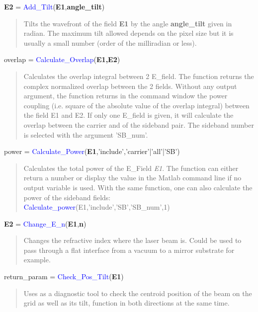 \noindent \textbf{E2} = \textcolor{blue}{ Add\_Tilt}(\textbf{E1},\textbf{angle\_tilt})
\vspace*{-0.2cm}
\begin{quote}
Tilts the wavefront of the field \textbf{E1} by the angle \textbf{angle\_tilt} given in radian. The maximum tilt allowed depends on the pixel size but it is usually a small number (order of the milliradian or less).
\end{quote}

\noindent overlap = \textcolor{blue}{Calculate\_Overlap}(\textbf{E1,E2})
\vspace*{-0.2cm}
\begin{quote}
Calculates the overlap integral between 2 E\_field. The function returns the complex normalized overlap between the 2 fields. Without any output argument, the function returns in the command window the power coupling (i.e. square of the absolute value of the overlap integral) between the field E1 and E2.
If only one E\_field is given, it will calculate the overlap between the carrier and of the sideband pair. The sideband number is selected with the argument 'SB\_num'.
\end{quote}

\noindent power = \textcolor{blue}{Calculate\_Power}(\textbf{E1},'include','carrier'|'all'|'SB')
\vspace*{-0.2cm}
\begin{quote}
Calculates the total power of the E\_Field \textsl{E1}. The function can either return a number or display the value in the Matlab command line if no output variable is used. With the same function, one can also calculate the power of the sideband fields:
\textcolor{blue}{Calculate\_power}(E1,'include','SB','SB\_num',1)
\end{quote}

\noindent \textbf{E2} = \textcolor{blue}{Change\_E\_n}(\textbf{E1},\textbf{n})
\vspace*{-0.2cm}
\begin{quote}
Changes the refractive index where the laser beam is. Could be used to pass through a flat interface from a vacuum to a mirror substrate for example.
\end{quote}

\noindent return\_param = \textcolor{blue}{Check\_Pos\_Tilt}(\textbf{E1})
\vspace*{-0.2cm}
\begin{quote}
Uses as a diagnostic tool to check the centroid position of the beam on the grid as well as its tilt, function in both directions at the same time.
\end{quote}

